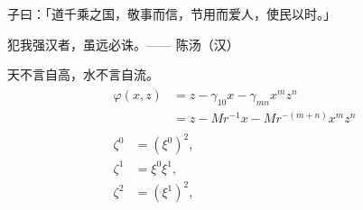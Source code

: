 \begin{defin}
子曰：「道千乘之国，敬事而信，节用而爱人，使民以时。」
\end{defin}

\begin{theo}
犯我强汉者，虽远必诛。\hfill —— 陈汤（汉）
\end{theo}

\begin{pro}
天不言自高，水不言自流。
\begin{gather*}
\begin{split} 
\varphi(x,z)
&=z-\gamma_{10}x-\gamma_{mn}x^mz^n\\
&=z-Mr^{-1}x-Mr^{-(m+n)}x^mz^n
\end{split}\\[6pt]
\begin{align} \zeta^0&=(\xi^0)^2,\\
\zeta^1 &=\xi^0\xi^1,\\
\zeta^2 &=(\xi^1)^2,
\end{align}
\end{gather*}
\end{pro}

